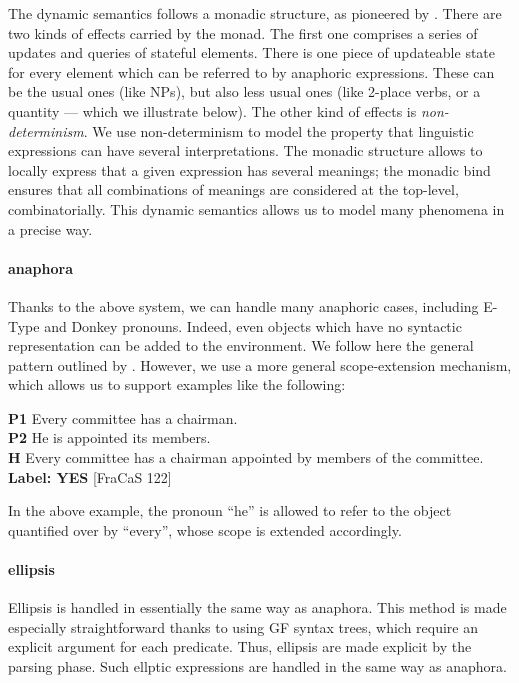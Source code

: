 \documentclass[11pt]{article}
\begin{document}
The dynamic semantics follows a monadic structure, as pioneered by
\citet{Shan:2002}. There are two kinds of effects carried by the
monad.  The first one comprises a series of updates and queries of
stateful elements.  There is one piece of updateable state for every
element which can be referred to by anaphoric expressions. These can
be the usual ones (like NPs), but also less usual ones (like 2-place
verbs, or a quantity --- which we illustrate below). The other kind of
effects is \emph{non-determinism}. We use non-determinism to model the
property that linguistic expressions can have several
interpretations. The monadic structure allows to locally express that
a given expression has several meanings; the monadic bind ensures that
all combinations of meanings are considered at the top-level,
combinatorially. This dynamic semantics allows us to model many
phenomena in a precise way.

\paragraph{anaphora} Thanks to the above system, we can handle many
anaphoric cases, including E-Type and Donkey pronouns. Indeed, even
objects which have no syntactic representation can be added to the
environment. We follow here the general pattern outlined by
\citet{unger:2011}. However, we use a more general scope-extension
mechanism, which allows us to support examples like  the following:
\begin{lingex}
\item
    \label{ex:anaphora-scope}
\textbf{P1}	Every committee has a chairman.\\
\textbf{P2}	He is appointed its members.\\
\textbf{H} 	Every committee has a chairman appointed by members of the committee. \\ \textbf{Label:	YES} [FraCaS 122]
\end{lingex}
In the above example, the pronoun ``he'' is allowed to refer to the
object quantified over by ``every'', whose scope is extended
accordingly.

\paragraph{ellipsis} Ellipsis is handled in essentially the same way
as anaphora. This method is made especially straightforward thanks to
using GF syntax trees, which require an explicit argument for each
predicate. Thus, ellipsis are made explicit by the parsing phase. Such
ellptic expressions are handled in the same way as anaphora.
\end{document}
